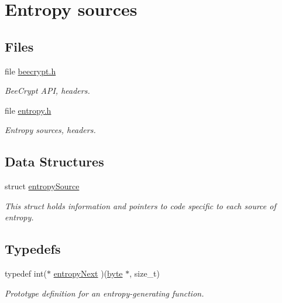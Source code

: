\hypertarget{group__ES__m}{
\section{Entropy sources}
\label{group__ES__m}
}
\subsection*{Files}
\begin{CompactItemize}
\item 
file \hyperlink{beecrypt_8h}{beecrypt.h}
\begin{CompactList}\small\item\em Bee\-Crypt API, headers. \item\end{CompactList}

\item 
file \hyperlink{entropy_8h}{entropy.h}
\begin{CompactList}\small\item\em Entropy sources, headers. \item\end{CompactList}

\end{CompactItemize}
\subsection*{Data Structures}
\begin{CompactItemize}
\item 
struct \hyperlink{structentropySource}{entropy\-Source}
\begin{CompactList}\small\item\em This struct holds information and pointers to code specific to each source of entropy. \item\end{CompactList}\end{CompactItemize}
\subsection*{Typedefs}
\begin{CompactItemize}
\item 
typedef int($\ast$ \hyperlink{group__ES__m_ga0}{entropy\-Next} )(\hyperlink{beecrypt_8api_8h_a3}{byte} $\ast$, size\_\-t)
\begin{CompactList}\small\item\em Prototype definition for an entropy-generating function. \item\end{CompactList}\end{CompactItemize}


